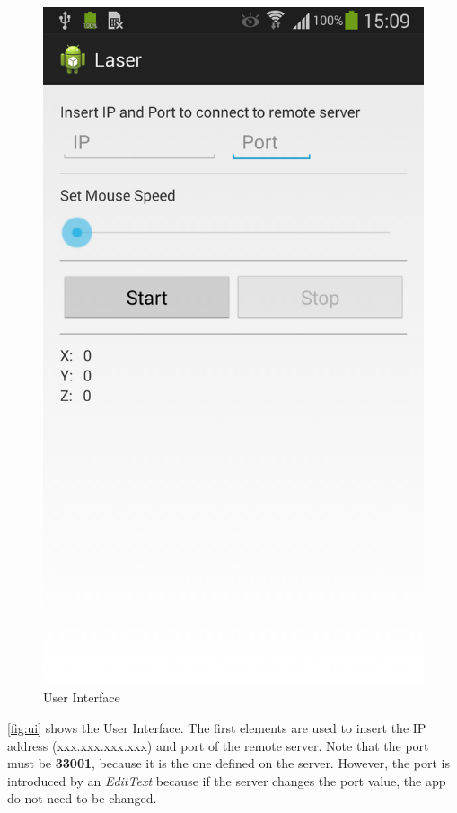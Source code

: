 \documentclass{llncs}
\begin{document}
\begin{figure}[h]
 \centering
 \includegraphics[scale=0.18]{figures/screenshot.png}
 \caption{User Interface}
 \label{fig:ui}
\end{figure}

\autoref{fig:ui} shows the User Interface. The first elements are used to insert the IP address (xxx.xxx.xxx.xxx) and port of the remote server. Note that the port must be \textbf{33001}, because it is the one defined on the server. However, the port is introduced by an \textit{EditText} because if the server changes the port value, the app do not need to be changed.
\\
\end{document}

